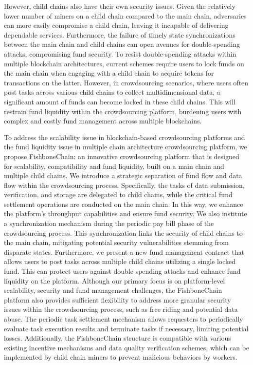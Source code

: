 \documentclass[10pt,journal]{IEEEtran}
\begin{document}
However, child chains also have their own security issues. Given the relatively lower number of miners on a child chain compared to the main chain, adversaries can more easily compromise a child chain, leaving it incapable of delivering dependable services. Furthermore, the failure of timely state synchronizations between the main chain and child chains can open avenues for double-spending attacks, compromising fund security. To resist double-spending attacks within multiple blockchain architectures, current schemes require users to lock funds on the main chain when engaging with a child chain to acquire tokens for transactions on the latter. However, in crowdsourcing scenarios, where users often post tasks across various child chains to collect multidimensional data, a significant amount of funds can become locked in these child chains. This will restrain fund liquidity within the crowdsourcing platform, burdening users with complex and costly fund management across multiple blockchains.

To address the scalability issue in blockchain-based crowdsourcing platforms and the fund liquidity issue in multiple chain architecture crowdsourcing platform, we propose FishboneChain: an innovative crowdsourcing platform that is designed for scalability, compatibility and fund liquidity, built on a main chain and multiple child chains. We introduce a strategic separation of fund flow and data flow within the crowdsourcing process. Specifically, the tasks of data submission, verification, and storage are delegated to child chains, while the critical fund settlement operations are conducted on the main chain. In this way, we enhance the platform's throughput capabilities and ensure fund security. We also institute a synchronization mechanism during the periodic pay bill phase of the crowdsourcing process. This synchronization links the security of child chains to the main chain, mitigating potential security vulnerabilities stemming from disparate states. Furthermore, we present a new fund management contract that allows users to post tasks across multiple child chains utilizing a single locked fund. This can protect users against double-spending attacks and enhance fund liquidity on the platform. Although our primary focus is on platform-level scalability, security and fund management challenges, the FishboneChain platform also provides sufficient flexibility to address more granular security issues within the crowdsourcing process, such as free riding and potential data abuse. The periodic task settlement mechanism allows requesters to periodically evaluate task execution results and terminate tasks if necessary, limiting potential losses. Additionally, the FishboneChain structure is compatible with various existing incentive mechanisms and data quality verification schemes, which can be implemented by child chain miners to prevent malicious behaviors by workers.
\end{document}
